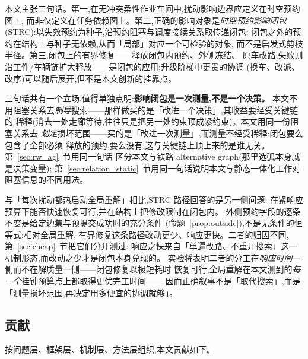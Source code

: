 \documentclass[manuscript,screen,review]{acmart}
\providecommand{\STRC}{\textsc{STRC}}
\begin{document}
本文主张三句话。第一,在无冲突柔性作业车间中,扰动影响边界应定义在时空预约图上,
而非仅定义在任务依赖图上。第二,正确的影响对象是\emph{时空预约影响闭包}
(\STRC):以失效预约为种子,沿预约阻塞与调度接续关系取传递闭包;
闭包之外的预约在结构上与种子无依赖,从而「局部」对应一个可检验的对象,
而不是启发式剪枝半径。第三,闭包上的有界修复——释放闭包内预约、外侧冻结、
原车改路,失败则沿工件/车辆链扩大释放——是闭包的应用;升级阶梯中更贵的协调
(换车、改派、改序)可以随后展开,但不是本文创新的挂靠点。

三句话共有一个立场,值得单独点明:\textbf{影响闭包是一次测量,不是一个决策。}
本文不用阻塞关系去\emph{制导}搜索——那样做买的是「改进一个决策」,其收益要经受关键链的
稀释(消去一处走廊等待,往往只是把另一处约束顶成紧约束)。本文用同一份阻塞关系去
\emph{划定}损坏范围——买的是「改进一次测量」,而测量不经受稀释:闭包要么包含了全部必须
释放的预约,要么没有,这与关键链上顶上来的是谁无关。第~\ref{sec:rw_ag}~节用同一句话
区分本文与铁路 alternative graph(那里选弧本身就是决策变量);
第~\ref{sec:relation_static}~节用同一句话说明本文与静态一体化工作对阻塞信息的不同用法。

与「每次扰动都热启动全局重解」相比,\STRC{} 路径回答的是另一侧问题:
在紧响应预算下能否快速恢复可行,并在结构上把修改限制在闭包内。
外侧预约字段的逐条不变是给定边集与预提交成功时的充分条件
(命题~\ref{prop:outside}),不是无条件的恒等式;相对全局重解,
有界修复这条路径改动更少、响应更快。二者的归因不同,第~\ref{sec:cheap}~节把它们分开测过:
响应之快来自「单遍改路、不重开搜索」这一机制形态,而改动之少才是闭包本身兑现的。
实验将表明二者的分工在\emph{响应时间}一侧而不在解质量一侧——闭包修复以极短耗时
恢复可行;全局重解在本文测到的\emph{每一个}挂钟预算点上都取得更优完工时间——
因而正确叙事不是「取代搜索」,而是「测量损坏范围,再决定用多便宜的协调就够」。

\subsection{贡献}
\label{sec:contributions}

按问题层、框架层、机制层、方法层组织,本文贡献如下。
\end{document}
